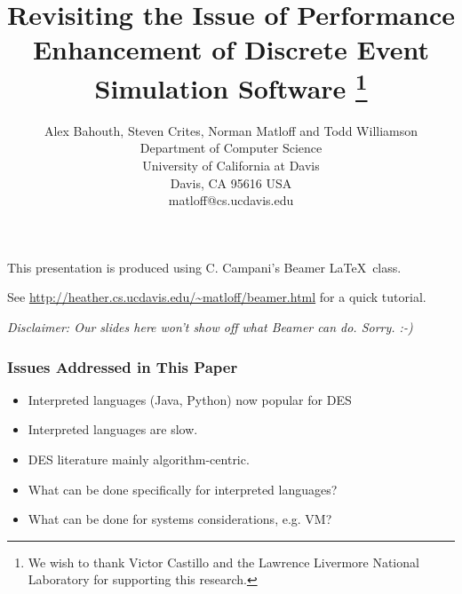 \documentclass{beamer}
\title{Revisiting the Issue of Performance Enhancement of Discrete Event
Simulation Software
   \thanks{We wish to thank Victor Castillo and the Lawrence Livermore
   National Laboratory for supporting this research.}
}
\author{
Alex Bahouth, 
Steven Crites,
Norman Matloff and
Todd Williamson \\
Department of Computer Science \\
University of California at Davis \\
Davis, CA 95616 USA \\
matloff@cs.ucdavis.edu 
}
\date{}
\begin{document}
 

\begin{frame}
\titlepage
\end{frame}

\begin{frame}
This presentation is produced using C. Campani's Beamer \LaTeX\ class.

See \url{http://heather.cs.ucdavis.edu/~matloff/beamer.html} for a quick
tutorial.

{\it Disclaimer:  Our slides here won't show off what Beamer can do.
Sorry. :-)}  

\end{frame}

\begin{frame}
\frametitle{Issues Addressed in This Paper}

\begin{itemize}

\item Interpreted languages (Java, Python) now popular for DES

\pause

\item Interpreted languages are slow.

\pause

\item DES literature mainly algorithm-centric.

\pause

\item What can be done specifically for interpreted languages?

\pause

\item What can be done for systems considerations, e.g. VM?

\end{itemize}

\end{frame}
\end{document}
